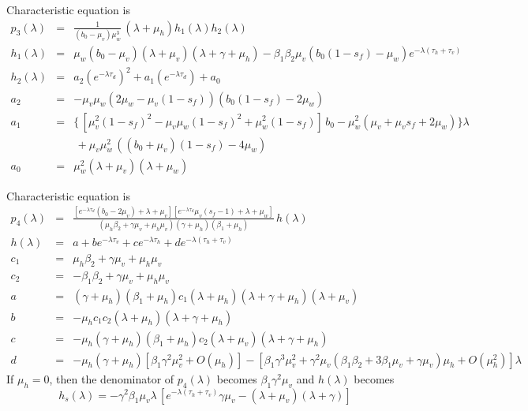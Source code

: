 \documentclass[12pt,leqno]{article}
\begin{document}
\quad
Characteristic equation is
\begin{eqnarray*}
p_3(\lambda) &=& \displaystyle\frac{1}{(b_0-\mu_v)\mu_w^3}\,(\lambda + \mu_h)h_1(\lambda)h_2(\lambda)\\
h_1(\lambda) &=& \mu_w(b_0-\mu_v)(\lambda+\mu_v)(\lambda+\gamma+\mu_h) -\beta_1\beta_2\mu_v(b_0(1-s_f)-\mu_w)e^{-\lambda(\tau_h+\tau_v)}\\
h_2(\lambda) &=& a_2 (e^{-\lambda\tau_d})^2 + a_1 (e^{-\lambda \tau_d}) + a_0\\
a_2 &=& -\mu_v\mu_w(2\mu_w-\mu_v(1-s_f))(b_0(1-s_f)-2\mu_w)\\
a_1 &=& \{\,[\mu_v^2(1-s_f)^2-\mu_v\mu_w(1-s_f)^2+\mu_w^2(1-s_f)]\,b_0 - \mu_w^2(\mu_v+\mu_vs_f+2\mu_w)\}\lambda\\
&& \,+ \mu_v\mu_w^2\,((b_0 +\mu_v)(1-s_f)-4\mu_w)\\
a_0 &=& \mu_w^2(\lambda + \mu_v)(\lambda + \mu_w)
\end{eqnarray*}

\quad Characteristic equation is
\begin{eqnarray*}
p_4(\lambda) &=& \displaystyle\frac{[e^{-\lambda\tau_d}(b_0-2\mu_v)+\lambda+\mu_v]
[e^{-\lambda \tau_d}\mu_v(s_f-1)+\lambda+\mu_w]}{(\mu_h\beta_2+\gamma\mu_v+\mu_h\mu_v)(\gamma+\mu_h)(\beta_1+\mu_h)}\,h(\lambda)\\
h(\lambda) &=& a + be^{-\lambda \tau_v} + c e^{-\lambda \tau_h} + d e^{-\lambda(\tau_h+\tau_v)}\\
c_1 &=& \mu_h\beta_2+\gamma \mu_v +\mu_h\mu_v\\
c_2 &=& -\beta_1\beta_2 + \gamma\mu_v +\mu_h\mu_v\\
a &=& (\gamma+\mu_h)(\beta_1+\mu_h)c_1(\lambda+\mu_h)(\lambda+\gamma+\mu_h)(\lambda+\mu_v)\\
b &=& -\mu_hc_1c_2(\lambda+\mu_h)(\lambda + \gamma+\mu_h)\\
c &=& -\mu_h(\gamma+\mu_h)(\beta_1+\mu_h)c_2(\lambda+\mu_v)(\lambda+\gamma+\mu_h)\\
d &=& -\mu_h(\gamma+\mu_h)[\beta_1\gamma^2\mu_v^2+O(\mu_h)]-[\beta_1\gamma^3\mu_v^2 + \gamma^2\mu_v(\beta_1\beta_2+3\beta_1\mu_v+\gamma\mu_v)\mu_h + O(\mu_h^2)]\lambda
\end{eqnarray*}
If $\mu_h=0$, then the denominator of $p_4(\lambda)$ becomes $\beta_1\gamma^2\mu_v$ and $h(\lambda)$ becomes 
\begin{equation}\label{hs}
h_s(\lambda) = -\gamma^2\beta_1\mu_v\lambda\,[e^{-\lambda(\tau_h+\tau_v)}\gamma\mu_v - (\lambda+\mu_v)(\lambda+\gamma)]
\end{equation}
\end{document}
